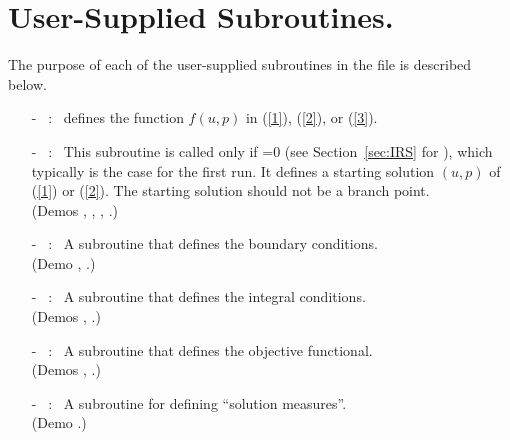 \newpage
\section{ User-Supplied Subroutines.} \label{sec: User_supplied_subroutines}
The purpose of each of the user-supplied subroutines in
the file  is described below.
  
\begin{itemize}
\item[-] ~:~
  defines the function $f(u,p)$ in (\ref{1}), (\ref{2}), or (\ref{3}).
\item[-] ~:~
  This subroutine is called only if =0 
(see Section~\ref{sec:IRS} for ),
  which typically is the case for the first run.
  It defines a starting solution $(u,p)$ of (\ref{1}) or (\ref{2}).
  The starting solution should not be a branch point.\\ 
  (Demos , , , .)  
\item[-] ~:~ 
  A subroutine  that defines the boundary conditions. \\
  (Demo , .)
\item[-] ~:~ 
  A subroutine  that defines the integral conditions. \\ 
  (Demos , .)  
\item[-] ~:~ 
  A subroutine  that defines the objective functional. \\ 
  (Demos , .)  
\item[-] ~:~
  A subroutine  for defining ``solution measures''. \\
  (Demo .)
\end{itemize}
 

